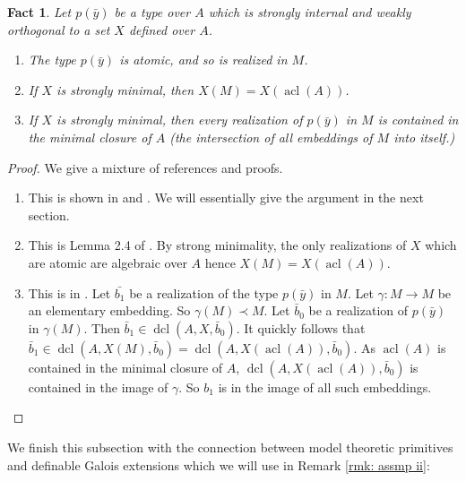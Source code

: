 \documentclass{amsart}
\newtheorem{fact}[theorem]{Fact}
\theoremstyle{definition}
\theoremstyle{remark}
\numberwithin{equation}{section}
\def \acl {\operatorname{acl}}
\def \dcl {\operatorname{dcl}}
\begin{document}
\begin{fact}\label{fact: def Galois corresp.}
    Let $p(\bar{y})$ be a type over $A$ which is strongly internal and weakly orthogonal to a set $X$ defined over $A$. 
    \begin{enumerate}
        \item The type $p(\bar{y})$ is atomic, and so is realized in $M$. 
        \item If $X$ is strongly minimal, then $X(M) = X(\acl(A))$.
        \item If $X$ is strongly minimal, then every realization of $p(\bar{y})$ in $M$ is contained in the minimal closure of $A$ (the intersection of all embeddings of $M$ into itself.)
    \end{enumerate}
\end{fact}

\begin{proof} We give a mixture of references and proofs.
    \begin{enumerate}
        \item This is shown in \cite{OmarAnand} and \cite{pillay_1998_DGI}. We will essentially give the argument in the next section.
        \item This is Lemma 2.4 of \cite{pillay_1998_DGI}. By strong minimality, the only realizations of $X$ which are atomic are algebraic over $A$ hence $X(M) = X(\acl(A))$.
        \item This is in \cite{poizatimaginare}. Let $\bar{b_1}$ be a realization of the type $p(\bar{y})$ in $M$. Let $\gamma:M \to M$ be an elementary embedding. So $\gamma(M) \prec M$. Let $\bar{b}_0$ be a realization of $p(\bar{y})$ in $\gamma(M)$. Then $\bar{b}_1 \in \dcl(A,X,\bar{b}_0)$. It quickly follows that $\bar{b}_1 \in \dcl(A,X(M),\bar{b}_0) = \dcl(A,X(\acl(A)),\bar{b}_0)$. As $\acl(A)$ is contained in the minimal closure of $A$, $\dcl(A,X(\acl(A)),\bar{b}_0)$ is contained in the image of $\gamma$. So $b_1$ is in the image of all such embeddings. 
    \end{enumerate}
\end{proof}

We finish this subsection with the connection between model theoretic primitives and definable Galois extensions which we will use in Remark \ref{rmk: assmp ii}:
\end{document}

